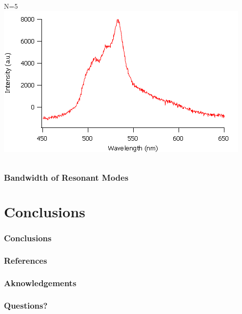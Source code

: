 \documentclass{beamer}
\begin{document}
\begin{frame}
\begin{columns}
\begin{column}{0.5\textwidth}
					N=5\\
					\includegraphics[width=\textwidth]{images/n5_fe.png}
				\end{column}
            \end{columns}
        \end{frame}
        
        \begin{frame}
            \frametitle{Bandwidth of Resonant Modes}
        \end{frame}
        
\section{Conclusions}
    \frame{\tableofcontents[currentsection]}
    \begin{frame}
        \frametitle{Conclusions}
    \end{frame}
    
    \begin{frame}
        \frametitle{References}
    \end{frame}
    
    \begin{frame}
        \frametitle{Aknowledgements}
    \end{frame}
    
    \begin{frame}
        \frametitle{Questions?}
    \end{frame}
    
\end{document}
